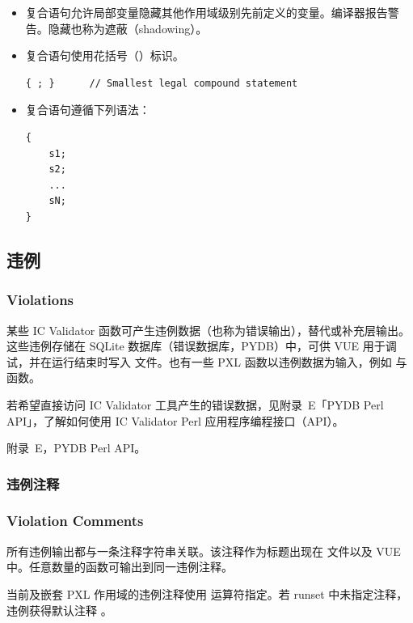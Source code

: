 \begin{itemize}
  \item 复合语句允许局部变量隐藏其他作用域级别先前定义的变量。编译器报告警告。隐藏也称为遮蔽（shadowing）。
  \item 复合语句使用花括号（\cmd{\{\}}）标识。
\begin{lstlisting}[style=pxl]
{ ; }      // Smallest legal compound statement
\end{lstlisting}
  \item 复合语句遵循下列语法：
\begin{lstlisting}[style=pxl]
{
    s1;
    s2;
    ...
    sN;
}
\end{lstlisting}
\end{itemize}

\subsection{违例}
\subsubsection*{Violations}

某些 IC Validator 函数可产生违例数据（也称为错误输出），替代或补充层输出。这些违例存储在 SQLite 数据库（错误数据库，PYDB）中，可供 VUE 用于调试，并在运行结束时写入  文件。也有一些 PXL 函数以违例数据为输入，例如  与  函数。

若希望直接访问 IC Validator 工具产生的错误数据，见附录~E「PYDB Perl API」，了解如何使用 IC Validator Perl 应用程序编程接口（API）。

\begin{seeAlsoBox}
附录~E，PYDB Perl API。
\end{seeAlsoBox}

\subsubsection{违例注释}
\subsubsection*{Violation Comments}

所有违例输出都与一条注释字符串关联。该注释作为标题出现在  文件以及 VUE 中。任意数量的函数可输出到同一违例注释。

当前及嵌套 PXL 作用域的违例注释使用  运算符指定。若 runset 中未指定注释，违例获得默认注释 。

